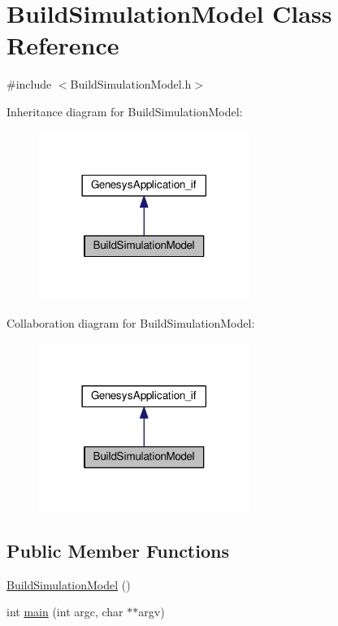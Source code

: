 \hypertarget{class_build_simulation_model}{\section{Build\-Simulation\-Model Class Reference}
\label{class_build_simulation_model}
}


{\ttfamily \#include $<$Build\-Simulation\-Model.\-h$>$}



Inheritance diagram for Build\-Simulation\-Model\-:\nopagebreak
\begin{figure}[H]
\begin{center}
\leavevmode
\includegraphics[width=194pt]{class_build_simulation_model__inherit__graph}
\end{center}
\end{figure}


Collaboration diagram for Build\-Simulation\-Model\-:\nopagebreak
\begin{figure}[H]
\begin{center}
\leavevmode
\includegraphics[width=194pt]{class_build_simulation_model__coll__graph}
\end{center}
\end{figure}
\subsection*{Public Member Functions}
\begin{DoxyCompactItemize}
\item 
\hyperlink{class_build_simulation_model_a477872592a89845e00cfbc7b6063bb21}{Build\-Simulation\-Model} ()
\item 
int \hyperlink{class_build_simulation_model_a8c50f55d7293860e5e7bc7e7e74f8d4a}{main} (int argc, char $\ast$$\ast$argv)
\end{DoxyCompactItemize}


